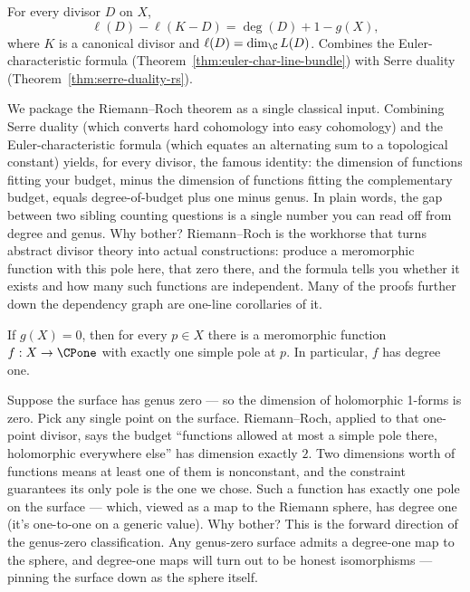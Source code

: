 \begin{theorem}
\label{input:riemann-roch}
\leanok
For every divisor \(D\) on \(X\),
\[
  \ell(D)-\ell(K-D)=\deg(D)+1-g(X),
\]
where \(K\) is a canonical divisor and \(\ell(D)=\dim_{\C} L(D)\).
Combines the Euler-characteristic formula
(Theorem~\ref{thm:euler-char-line-bundle}) with Serre duality
(Theorem~\ref{thm:serre-duality-rs}).
\end{theorem}

\begin{layman}
We package the Riemann–Roch theorem as a single classical input.
Combining Serre duality (which converts hard cohomology into easy
cohomology) and the Euler-characteristic formula (which equates an
alternating sum to a topological constant) yields, for every divisor,
the famous identity: the dimension of functions fitting your budget,
minus the dimension of functions fitting the complementary budget,
equals degree-of-budget plus one minus genus. In plain words, the gap
between two sibling counting questions is a single number you can read
off from degree and genus. Why bother? Riemann–Roch is the workhorse
that turns abstract divisor theory into actual constructions: produce a
meromorphic function with this pole here, that zero there, and the
formula tells you whether it exists and how many such functions are
independent. Many of the proofs further down the dependency graph are
one-line corollaries of it.
\end{layman}

\begin{proposition}
\label{prop:genus-zero-degree-one-map}
If \(g(X)=0\), then for every \(p\in X\) there is a meromorphic function
\(f:X\to\CPone\) with exactly one simple pole at \(p\). In particular, \(f\)
has degree one.
\leanok
\end{proposition}

\begin{layman}
Suppose the surface has genus zero — so the dimension of holomorphic
1-forms is zero. Pick any single point on the surface. Riemann–Roch,
applied to that one-point divisor, says the budget ``functions allowed
at most a simple pole there, holomorphic everywhere else'' has dimension
exactly \(2\). Two dimensions worth of functions means at least one of
them is nonconstant, and the constraint guarantees its only pole is the
one we chose. Such a function has exactly one pole on the surface —
which, viewed as a map to the Riemann sphere, has degree one (it's
one-to-one on a generic value). Why bother? This is the forward
direction of the genus-zero classification. Any genus-zero surface
admits a degree-one map to the sphere, and degree-one maps will turn out
to be honest isomorphisms — pinning the surface down as the sphere
itself.
\end{layman}

